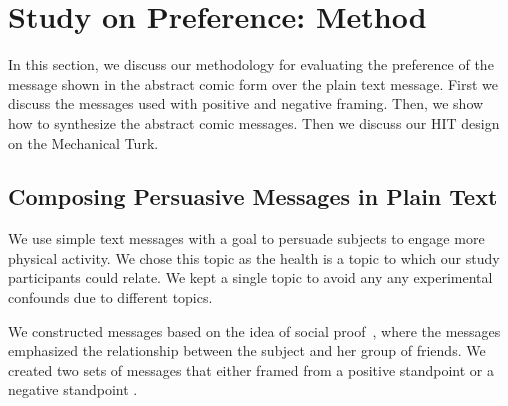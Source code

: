 
\section{Study on Preference: Method}
\label{sec:preference}

In this section, we discuss our methodology for evaluating the preference of the message shown in the abstract comic form over the plain text message. First we discuss the messages used with positive and negative framing. Then, we show how to synthesize the abstract comic messages. Then we discuss our HIT design on the Mechanical Turk.


\subsection{Composing Persuasive Messages in Plain Text}
We use simple text messages with a goal to persuade subjects to engage more physical activity. We chose this topic as the health is a topic to which our study participants could relate. We kept a single topic to avoid any any experimental confounds due to different topics.


We constructed messages based on the idea of social proof~\cite{goldstein2008room}, where the messages emphasized the relationship between the subject and her group of friends. We created two sets of messages that either framed from a positive standpoint or a negative standpoint \cite{tversky1981framing}.

